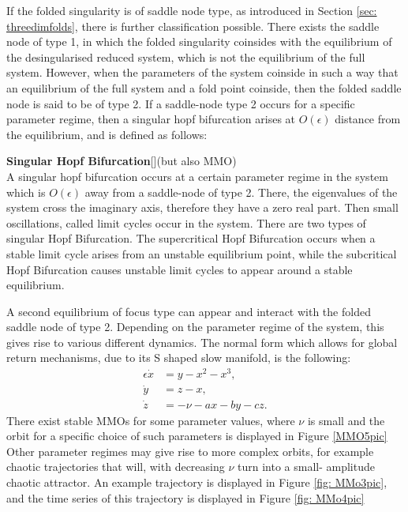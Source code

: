 If the folded singularity is of saddle node type, as introduced in Section \ref{sec: threedimfolds}, there is further classification possible.
There exists the saddle node of type 1, in which the folded singularity coinsides with the equilibrium of the desingularised reduced system, which is not the equilibrium of the full system. However, when the parameters of the system coinside in such a way that an equilibrium of the full system and a fold point coinside, then the folded saddle node is said to be of type 2. 
If a saddle-node type 2 occurs for a specific parameter regime, then a singular hopf bifurcation arises at $O(\epsilon)$ distance from the equilibrium, and is defined as follows:
\begin{definition}{\textbf{Singular Hopf Bifurcation}}[\citealp{strogatz2007nonlinear}](but also MMO) \\
A singular hopf bifurcation occurs at a certain parameter regime in the system which is $O(\epsilon)$ away from a saddle-node of type 2. There, the eigenvalues of the system cross the imaginary axis, therefore they have a zero real part. Then small oscillations, called limit cycles occur in the system. There are two types of singular Hopf Bifurcation.
The supercritical Hopf Bifurcation occurs when a stable limit cycle arises from an unstable equilibrium point, while the subcritical Hopf Bifurcation causes unstable limit cycles to appear around a stable equilibrium.
\end{definition}

A second equilibrium of focus type can appear and interact with the folded saddle node of type 2.
Depending on the parameter regime of the system, this gives rise to various different dynamics.
The normal form which allows for global return mechanisms, due to its S shaped slow manifold, is the following:
\begin{align*}
\epsilon \dot{x} &= y - x^2 - x^3, \\
\dot{y} &= z - x, \\
\dot{z} &= -\nu -ax -by -cz.
\end{align*}
There exist stable MMOs for some parameter values, where $\nu$ is small and the orbit for a specific choice of such parameters is displayed in Figure \ref{MMO5pic}
Other parameter regimes may give rise to more complex orbits, for example chaotic trajectories that will, with decreasing $\nu$ turn into a small- amplitude chaotic attractor. An example trajectory is displayed in Figure \ref{fig: MMo3pic}, and the time series of this trajectory is displayed in Figure \ref{fig: MMo4pic} 

